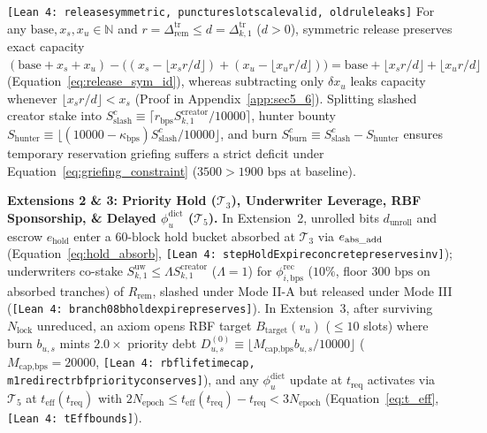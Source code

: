 \documentclass[runningheads,a4paper]{llncs}
\renewcommand{\_}{\textunderscore\allowbreak}
\newcommand{\leanref}[1]{{\footnotesize\texttt{[Lean 4: #1]}}}
\begin{document}
\begin{lemma}
\label{lem:release_symmetric}
\leanref{release\_symmetric, puncture\_slot\_scale\_valid, old\_rule\_leaks}
For any $\text{base},\allowbreak x_s,\allowbreak x_u \in \mathbb{N}$ and $r = \Delta_{\text{rem}}^{\text{tr}} \le d = \Delta_{k,1}^{\text{tr}}$ ($d > 0$), symmetric release preserves exact capacity $(\text{base} + x_s + x_u) - \big((x_s - \lfloor x_s r / d \rfloor) + (x_u - \lfloor x_u r / d \rfloor)\big) = \text{base} + \lfloor x_s r / d \rfloor + \lfloor x_u r / d \rfloor$ (Equation~\eqref{eq:release_sym_id}), whereas subtracting only $\delta x_u$ leaks capacity whenever $\lfloor x_s r / d \rfloor < x_s$ (Proof in Appendix~\ref{app:sec5_6}). Splitting slashed creator stake into $S_{\text{slash}}^c \equiv \lceil r_{\text{bps}} S_{k,1}^{\text{creator}} / 10000 \rceil$, hunter bounty $S_{\text{hunter}} \equiv \lfloor (10000 - \kappa_{\text{bps}}) S_{\text{slash}}^c / 10000 \rfloor$, and burn $S_{\text{burn}}^c \equiv S_{\text{slash}}^c - S_{\text{hunter}}$ ensures temporary reservation griefing suffers a strict deficit under Equation~\eqref{eq:griefing_constraint} ($3500 > 1900\text{ bps}$ at baseline).
\end{lemma}

\textbf{Extensions 2 \& 3: Priority Hold ($\mathcal{T}_3$), Underwriter Leverage, RBF Sponsorship, \& Delayed $\phi_u^{\text{dict}}$ ($\mathcal{T}_5$).} In Extension~2, unrolled bits $d_{\text{unroll}}$ and escrow $e_{\text{hold}}$ enter a $60\text{-block}$ hold bucket absorbed at $\mathcal{T}_3$ via $e_{\text{abs\_add}}$ (Equation~\eqref{eq:hold_absorb}, \leanref{stepHoldExpire\_concrete\_preserves\_inv}); underwriters co-stake $S_{k,1}^{\text{uw}} \le \Lambda S_{k,1}^{\text{creator}}$ ($\Lambda=1$) for $\phi_{i,\text{bps}}^{\text{rec}}$ ($10\%$, floor $300\text{ bps}$ on absorbed tranches) of $R_{\text{rem}}$, slashed under Mode II-A but released under Mode III (\leanref{branch08b\_hold\_expire\_preserves}). In Extension~3, after surviving $N_{\text{lock}}$ unreduced, an axiom opens RBF target $B_{\text{target}}(v_u)$ ($\le 10$ slots) where burn $b_{u,s}$ mints $2.0\times$ priority debt $D_{u,s}^{(0)} \equiv \lfloor M_{\text{cap,bps}} b_{u,s} / 10000 \rfloor$ ($M_{\text{cap,bps}} = 20000$, \leanref{rbf\_lifetime\_cap, m1\_redirect\_rbf\_priority\_conserves}), and any $\phi_u^{\text{dict}}$ update at $t_{\text{req}}$ activates via $\mathcal{T}_5$ at $t_{\text{eff}}(t_{\text{req}})$ with $2 N_{\text{epoch}} \le t_{\text{eff}}(t_{\text{req}}) - t_{\text{req}} < 3 N_{\text{epoch}}$ (Equation~\eqref{eq:t_eff}, \leanref{tEff\_bounds}).
\end{document}
